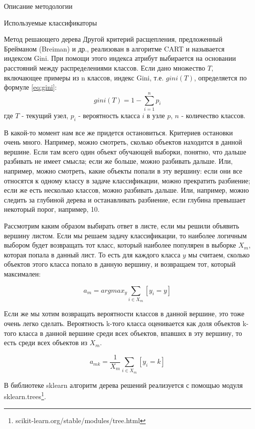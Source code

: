 \begin{section}{Описание методологии}
\begin{subsection}{Используемые классификаторы}
\begin{subsubsection}{Метод решающего дерева}
Другой критерий расщепления, предложенный Брейманом (Breiman) и др., реализован в алгоритме CART и называется индексом Gini. При помощи этого индекса атрибут выбирается на основании расстояний между распределениями классов.
Если дано множество $T$, включающее примеры из n классов, индекс Gini, т.е. $gini(T)$, определяется по формуле \ref{eq:gini}:
\begin{equation}
  \label{eq:gini}
  gini(T)=1 - \sum\limits_{i=1}^n p_i
\end{equation}
где $T$ - текущий узел, $p_i$ - вероятность класса $i$ в узле $p$, $n$  - количество классов.

   В какой-то момент нам все же придется остановиться. Критериев остановки очень много. Например, можно смотреть, сколько объектов находится в данной вершине. Если там всего один объект обучающей выборки, понятно, что дальше разбивать не имеет смысла; если же больше, можно разбивать дальше. Или, например, можно смотреть, какие объекты попали в эту вершину: если они все относятся к одному классу в задаче классификации, можно прекратить разбиение; если же есть несколько классов, можно разбивать дальше. Или, например, можно следить за глубиной дерева и останавливать разбиение, если глубина превышает некоторый порог, например, 10.

	Рассмотрим каким образом выбирать ответ в листе, если мы решили объявить вершину листом.  Если мы решаем задачу классификации, то наиболее логичным выбором будет возвращать тот класс, который наиболее популярен в выборке $X_m$, которая попала в данный лист. То есть для каждого класса $y$ мы считаем, сколько объектов этого класса попало в данную вершину, и возвращаем тот, который максимален:

	\begin{equation}
	a_m = arg⁡max_{y}  \sum\limits_{i \in X_m} [y_i = y]
	\end{equation}

	Если же мы хотим возвращать вероятности классов в данной вершине, это тоже очень легко сделать. Вероятность k-того класса оценивается как доля объектов k-того класса в данной вершине среди всех объектов, впавших в эту вершину, то есть среди всех объектов из $X_m$.

	\begin{equation}
	a_{mk} = \frac{1}{X_m}  \sum\limits_{i \in X_m} [y_i = k]
	\end{equation}

  В библиотеке sklearn алгоритм дерева решений реализуется с помощью модуля sklearn.trees\footnote{scikit-learn.org/stable/modules/tree.html}.
    \end{subsubsection}


\end{subsection}
\end{section}
